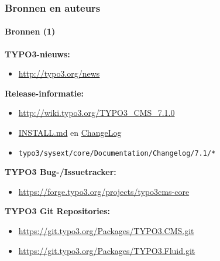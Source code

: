 \begin{frame}[fragile]
	\frametitle{Bronnen en auteurs}
	\framesubtitle{Bronnen (1)}

	\textbf{TYPO3-nieuws:}
		\begin{itemize}\smaller
			\item \url{http://typo3.org/news}
		\end{itemize}

	\textbf{Release-informatie:}
		\begin{itemize}\smaller
			\item \url{http://wiki.typo3.org/TYPO3_CMS_7.1.0}
			\item \href{https://github.com/TYPO3/TYPO3.CMS/blob/master/INSTALL.md}{INSTALL.md} en \href{https://github.com/TYPO3/TYPO3.CMS/blob/master/ChangeLog}{ChangeLog}
			\item \texttt{typo3/sysext/core/Documentation/Changelog/7.1/*}
		\end{itemize}

	\textbf{TYPO3 Bug-/Issuetracker:}
		\begin{itemize}\smaller
			\item \url{https://forge.typo3.org/projects/typo3cms-core}
		\end{itemize}

	\textbf{TYPO3 Git Repositories:}
		\begin{itemize}\smaller
			\item \url{https://git.typo3.org/Packages/TYPO3.CMS.git}
			\item \url{https://git.typo3.org/Packages/TYPO3.Fluid.git}
		\end{itemize}

\end{frame}



